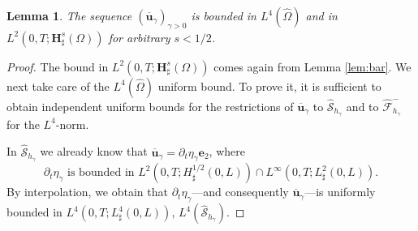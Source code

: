 \documentclass[10pt]{amsart}
\let\mathcal\mathscr
\newtheorem{lemma}[theorem]{Lemma}
\theoremstyle{remark}
\theoremstyle{definition}
\newcommand{\ug}{\boldsymbol{u}}
\newcommand{\BS}[1]{\boldsymbol{#1}}
\let\CM\Omega
\newcommand{\CMT}{\widehat{\Omega}}
\begin{document}
\begin{lemma}
\label{lem:extension-u}
The sequence $(\overline{\ug}_{\gamma})_{\gamma >0}$ is bounded in $L^{4}(\CMT)$ and in
$L^{2}(0,T;\BS{H}^{s}_{\sharp}(\CM))$ for arbitrary $s<1/2$.
\end{lemma}
\begin{proof}The bound in $L^{2}(0,T;\BS{H}^{s}_{\sharp}(\CM))$ comes again from Lemma \ref{lem:bar}. We next take care of the $L^{4}(\CMT)$ uniform bound.
To prove it, it is sufficient to obtain independent uniform bounds for the restrictions
of $\overline{\ug}_{\gamma}$ to $\widehat{\mathcal S}_{h_{\gamma}}$ and to $\widehat{\mathcal F}^{-}_{h_{\gamma}}$ for the $L^4$-norm.

In $\widehat{\mathcal{S}}_{h_{\gamma}}$ we already know that $\overline{\ug}_{\gamma}=\partial_{t}\eta_{\gamma}\BS{e}_{2}$, where 
\[
\text{$\partial_t{\eta}_{\gamma}$ is bounded in $L^{2}(0,T;H_\sharp^{1/2}(0,L)) \cap L^{\infty}(0,T;L_\sharp^{2}(0,L))$.}
\]
By interpolation, we obtain that $\partial_{t}\eta_{\gamma}$---and consequently \resp $\overline{\ug}_{\gamma}$---is uniformly bounded in $L^{4}(0,T;L_\sharp^{4}(0,L))$, \resp $L^4(\widehat{\mathcal S}_{h_{\gamma}})$.


\end{proof}
\end{document}
